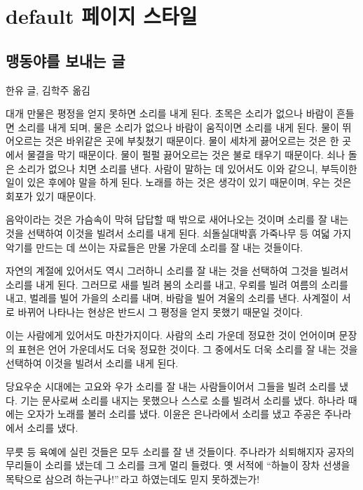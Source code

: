 \documentclass[demo,chapter,openany,amsmath,gremph]{oblivoir}
\def\epigraph#1#2{#1\quad #2}
\begin{document}
\chapter{default 페이지 스타일}

\section{맹동야를 보내는 글}
\epigraph{한유 글, }{김학주 옮김}

대개 만물은 평정을 얻지 못하면 소리를 내게 된다.
초목은 소리가 없으나 바람이 흔들면 소리를 내게 되며, 물은 소리가 없으나 바람이
움직이면 소리를 내게 된다. 물이 뛰어오르는 것은 바위같은 곳에 부칮쳤기
때문이다. 물이 세차게 끓어오르는 것은 한 곳에서 물결을 막기 때문이다.
물이 펄펄 끓어오르는 것은 불로 태우기 때문이다. 쇠나 돌은 소리가 없으나
치면 소리를 낸다. 사람이 말하는 데 있어서도 이와 같으니,
부득이한 일이 있은 후에야 말을 하게 된다. 노래를 하는 것은 생각이
있기 때문이며, 우는 것은 회포가 있기 때문이다.

음악이라는 것은 가슴속이 막혀 답답할 때 밖으로 새어나오는 것이며
소리를 잘 내는 것을 선택하여 이것을 빌려서 소리를 내게 된다.
쇠\cntrdot 돌\cntrdot 실\cntrdot 대\cntrdot 박\cntrdot 흙\cntrdot 
가죽\cntrdot 나무 등 여덟 가지 악기를 만드는 데 쓰이는 자료들은 만물
가운데 소리를 잘 내는 것들이다.

자연의 계절에 있어서도 역시 그러하니 소리를 잘 내는 것을 선택하여 그것을
빌려서 소리를 내게 된다. 그러므로 새를 빌려 봄의 소리를 내고, 우뢰를
빌려 여름의 소리를 내고, 벌레를 빌어 가을의 소리를 내며,
바람을 빌어 겨울의 소리를 낸다. 사계절이 서로 바뀌어 나타나는 현상은
반드시 그 평정을 얻지 못했기 때문일 것이다.

이는 사람에게 있어서도 마찬가지이다. 사람의 소리 가운데 정묘한 것이 언어이며
문장의 표현은 언어 가운데서도 더욱 정묘한 것이다. 그 중에서도 더욱 소리를
잘 내는 것을 선택하여 이것을 빌려서 소리를 내게 된다.

당요\cntrdot 우순 시대에는 고요와 우가 소리를 잘 내는 사람들이어서
그들을 빌려 소리를 냈다. 기는 문사로써 소리를 내지는 못했으나
스스로 소를 빌려서 소리를 냈다. 하나라 때에는 오자가 노래를 불러 소리를
냈다. 이윤은 은나라에서 소리를 냈고 주공은 주나라에서 소리를 냈다.

무릇 \cntrdot {} 등 육예에 실린 것들은 모두 소리를
잘 낸 것들이다. 주나라가 쇠퇴해지자 공자의 무리들이 소리를 냈는데
그 소리를 크게 멀리 들렸다. 옛 서적에 ``하늘이 장차 선생을 목탁으로
삼으려 하는구나!''\,라고 하였는데도 믿지 못하겠는가!
\end{document}

